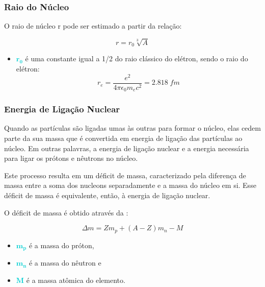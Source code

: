 \documentclass[11pt,a4paper]{article}
\newcounter{exemplo}
\begin{document}
\subsubsection*{Raio do Núcleo}

    O raio de núcleo r pode ser estimado a partir da relação:

        \begin{equation}
            r = r_0 \sqrt[3]{A} 
        \end{equation}

		\begin{exemplo}[onde:]
			\begin{itemize}
				\item \textcolor{DarkTurquoise}{$\mathbf{r_0}$} é uma constante igual a 1/2 do raio clássico do elétron, sendo o raio do elétron:
                \begin{equation}
                    r_e = \frac{e^2}{4 \pi \epsilon_0 m_e c^2} = 2.818 \; fm
                \end{equation}
			\end{itemize}
		\end{exemplo}
            
\subsubsection*{Energia de Ligação Nuclear}

	Quando as partículas são ligadas umas às outras para formar o núcleo, elas cedem parte da sua massa que é convertida em energia de ligação das partículas ao núcleo. Em outras palavras, a energia de ligação nuclear e a energia necessária para ligar os prótons e nêutrons no núcleo. 

	Este processo resulta em um déficit de massa, caracterizado pela diferença de massa entre a soma dos nucleons separadamente e a massa do núcleo em si. Esse déficit de massa é equivalente, então, à energia de ligação nuclear.

     O déficit de massa é obtido através da :

        \begin{equation}
            \Delta  m = Zm_p + (A - Z)m_n - M
        \end{equation}

		\begin{exemplo}[onde:]
			\begin{itemize}
				\item \textcolor{DarkTurquoise}{$\mathbf{m_p}$} é a massa do próton,
				\item \textcolor{DarkTurquoise}{$\mathbf{m_n}$} é a massa do nêutron e
				\item \textcolor{DarkTurquoise}{$\mathbf{M}$} é a massa atômica do elemento.
			\end{itemize}
		\end{exemplo}
\end{document}
